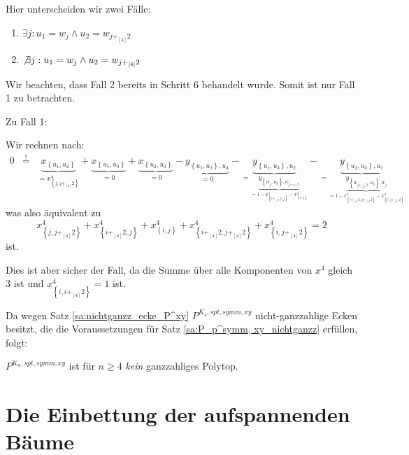 \documentclass[10p,a4paper,BCOR = 12mm, DIV=15]{scrbook}
\begin{document}
\begin{bew}
Hier unterscheiden wir zwei Fälle:
\begin{enumerate}
\item $\exists j: u_1 = w_j \wedge u_2 = w_{j +_{\left[4\right]} 2}$
\item $\not\exists j: u_1 = w_j \wedge u_2 = w_{j +_{\left[4\right]} 2}$
\end{enumerate}

Wir beachten, dass Fall 2 bereits in Schritt 6 behandelt wurde. Somit ist nur Fall 1 zu betrachten.

Zu Fall 1:

Wir rechnen nach:
\begin{eqnarray*}
0 & \stackrel{!}{=} & \underbrace{x_{\left\{u_1, u_2\right\}}}_{= x^{4}_{\left\{j, j +_{\left[4\right]} 2\right\}}} + \underbrace{x_{\left\{u_1, u_3\right\}}}_{= 0} + \underbrace{x_{\left\{u_2, u_3\right\}}}_{= 0} - \underbrace{y_{\left\{u_1, u_2\right\}, u_3}}_{= 0} - \underbrace{y_{\left\{u_1, u_3\right\}, u_2}}_{= \underbrace{y_{\left\{w_j, u_3\right\}, w_{j +_{\left[4\right]} 2}}}_{= 1 - x^{4}_{\left\{i+_{\left[4\right]} 2, j\right\}} - x^{4}_{\left\{i, j\right\}}}}  - \underbrace{y_{\left\{u_2, u_3\right\}, u_1}}_{= \underbrace{y_{\left\{w_{j +_{\left[4\right]} 2}, u_3\right\}, w_j}}_{= 1 - x^{4}_{\left\{i+_{\left[4\right]} 2, j +_{\left[4\right]} 2\right\}} - x^{4}_{\left\{i, j +_{\left[4\right]} 2\right\}}}}
\end{eqnarray*}
was also äquivalent zu
\begin{displaymath}
x^{4}_{\left\{j, j +_{\left[4\right]} 2\right\}} + x^{4}_{\left\{i+_{\left[4\right]} 2, j\right\}} + x^{4}_{\left\{i, j\right\}} + x^{4}_{\left\{i+_{\left[4\right]} 2, j +_{\left[4\right]} 2\right\}} + x^{4}_{\left\{i, j +_{\left[4\right]} 2\right\}} = 2
\end{displaymath}
ist.

Dies ist aber sicher der Fall, da die Summe über alle Komponenten von $x^{4}$ gleich 3 ist und $x^{4}_{\left\{i, i +_{\left[4\right]} 2\right\}} = 1$ ist.
\end{bew}

Da wegen Satz \ref{sa:nichtganzz_ecke_P^xy} $P^{K_4, spt, symm, xy}$ nicht-ganzzahlige Ecken besitzt, die die Voraussetzungen für Satz \ref{sa:P_p^symm, xy_nichtganzz} erfüllen, folgt:

\begin{Kor}
$P^{K_n, spt, symm, xy}$ ist für $n\geq 4$ \emph{kein} ganzzahliges Polytop.
\end{Kor}

\chapter{Die Einbettung der aufspannenden Bäume}
\end{document}
